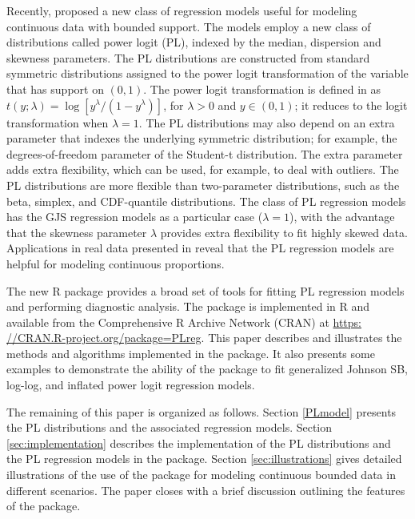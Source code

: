 Recently, \cite{QueirozFerrari2023} proposed a new class of regression models useful for modeling continuous data with bounded support. The models employ a new class of distributions called power logit (PL), indexed by the median, dispersion and skewness parameters. The PL distributions are constructed from standard symmetric distributions assigned to the power logit transformation of the variable that has support on $(0, 1)$. The power logit transformation is defined in \cite{QueirozFerrari2023} as $t(y; \lambda) = \log[y^\lambda/(1-y^\lambda)]$, for $\lambda>0$ and $y \in (0,1)$; it reduces to the logit transformation when $\lambda=1$. The PL distributions may also depend on an extra parameter that indexes the underlying symmetric distribution; for example, the degrees-of-freedom parameter of the Student-t distribution. The extra parameter adds extra flexibility, which can be used, for example, to deal with outliers. The PL distributions are more flexible than two-parameter distributions, such as the beta, simplex, and CDF-quantile distributions. The class of PL regression models has the GJS regression models as a particular case ($\lambda=1$), with the advantage that the skewness parameter $\lambda$ provides extra flexibility to fit highly skewed data. Applications in real data presented in \cite{QueirozFerrari2023} reveal that the PL regression models are helpful for modeling continuous proportions. 

The new R package  provides a broad set of tools for fitting PL regression models and performing diagnostic analysis. The package is implemented in R and available from the Comprehensive R Archive Network (CRAN) at \url{https:
//CRAN.R-project.org/package=PLreg}. This paper describes and illustrates the methods and algorithms implemented in the package. It also presents some examples to demonstrate the ability of the package to fit generalized Johnson SB, log-log, and inflated power logit regression models.

The remaining of this paper is organized as follows. Section \ref{PLmodel} presents the PL distributions and the associated regression models. Section \ref{sec:implementation} describes the implementation of the PL distributions and the PL regression models in the  package. Section \ref{sec:illustrations} gives detailed illustrations of the use of the  package for modeling continuous bounded data in different scenarios. The paper closes with a brief discussion outlining the features of the  package.

